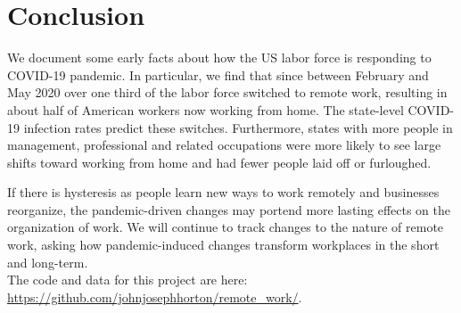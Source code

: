 \documentclass[12pt]{article}
\begin{document}



\section{Conclusion}
We document some early facts about how the US labor force is responding to COVID-19 pandemic.  In particular, we find that since between February and May 2020 over one third of the labor force switched to remote work, resulting in about half of American workers now working from home. The state-level COVID-19 infection rates predict these switches. Furthermore, states with more people in management, professional and related occupations were more likely to see large shifts toward working from home and had fewer people laid off or furloughed. 

If there is hysteresis as people learn new ways to work remotely and businesses reorganize, the pandemic-driven changes may portend more lasting effects on the organization of work.
We will continue to track changes to the nature of remote work, asking how pandemic-induced changes transform workplaces in the short and long-term. \\

\noindent The code and data for this project are here:
\href{https://github.com/johnjosephhorton/remote\_work/}{https://github.com/johnjosephhorton/remote\_work/}.


\newpage \clearpage


\end{document}
